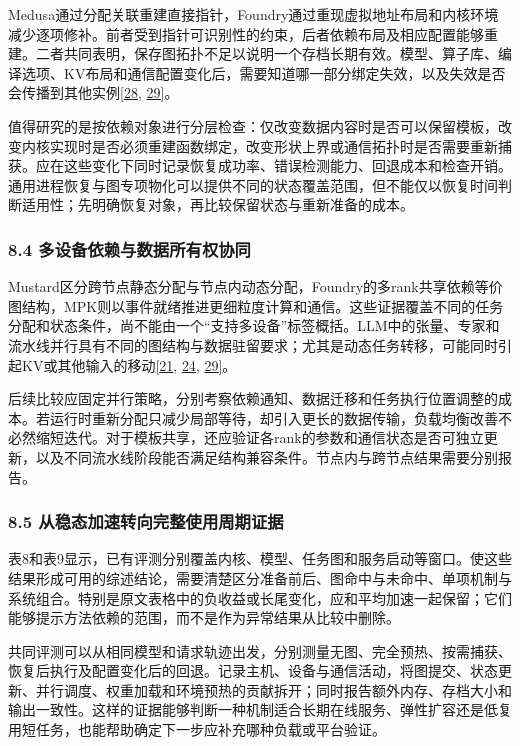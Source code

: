 \documentclass[UTF8,11pt,fontset=windows]{ctexart}
\begin{document}
Medusa通过分配关联重建直接指针，Foundry通过重现虚拟地址布局和内核环境减少逐项修补。前者受到指针可识别性的约束，后者依赖布局及相应配置能够重建。二者共同表明，保存图拓扑不足以说明一个存档长期有效。模型、算子库、编译选项、KV布局和通信配置变化后，需要知道哪一部分绑定失效，以及失效是否会传播到其他实例\protect\hyperlink{ref-28}{{[}28}, \protect\hyperlink{ref-29}{29{]}}。

值得研究的是按依赖对象进行分层检查：仅改变数据内容时是否可以保留模板，改变内核实现时是否必须重建函数绑定，改变形状上界或通信拓扑时是否需要重新捕获。应在这些变化下同时记录恢复成功率、错误检测能力、回退成本和检查开销。通用进程恢复与图专项物化可以提供不同的状态覆盖范围，但不能仅以恢复时间判断适用性；先明确恢复对象，再比较保留状态与重新准备的成本。

\hypertarget{section-8-4}{%
\subsubsection{8.4 多设备依赖与数据所有权协同}\label{section-8-4}}

Mustard区分跨节点静态分配与节点内动态分配，Foundry的多rank共享依赖等价图结构，MPK则以事件就绪推进更细粒度计算和通信。这些证据覆盖不同的任务分配和状态条件，尚不能由一个``支持多设备''标签概括。LLM中的张量、专家和流水线并行具有不同的图结构与数据驻留要求；尤其是动态任务转移，可能同时引起KV或其他输入的移动\protect\hyperlink{ref-21}{{[}21}, \protect\hyperlink{ref-24}{24}, \protect\hyperlink{ref-29}{29{]}}。

后续比较应固定并行策略，分别考察依赖通知、数据迁移和任务执行位置调整的成本。若运行时重新分配只减少局部等待，却引入更长的数据传输，负载均衡改善不必然缩短迭代。对于模板共享，还应验证各rank的参数和通信状态是否可独立更新，以及不同流水线阶段能否满足结构兼容条件。节点内与跨节点结果需要分别报告。

\hypertarget{section-8-5}{%
\subsubsection{8.5 从稳态加速转向完整使用周期证据}\label{section-8-5}}

表8和表9显示，已有评测分别覆盖内核、模型、任务图和服务启动等窗口。使这些结果形成可用的综述结论，需要清楚区分准备前后、图命中与未命中、单项机制与系统组合。特别是原文表格中的负收益或长尾变化，应和平均加速一起保留；它们能够提示方法依赖的范围，而不是作为异常结果从比较中删除。

共同评测可以从相同模型和请求轨迹出发，分别测量无图、完全预热、按需捕获、恢复后执行及配置变化后的回退。记录主机、设备与通信活动，将图提交、状态更新、并行调度、权重加载和环境预热的贡献拆开；同时报告额外内存、存档大小和输出一致性。这样的证据能够判断一种机制适合长期在线服务、弹性扩容还是低复用短任务，也能帮助确定下一步应补充哪种负载或平台验证。
\end{document}
